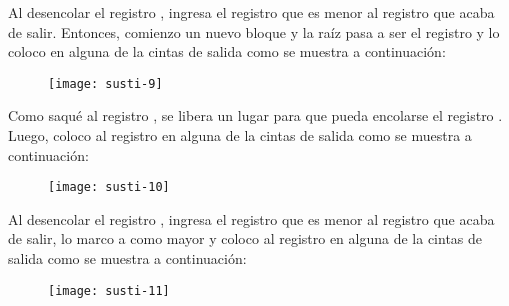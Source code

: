 \documentclass[10pt,a4paper]{article}
\begin{document}
Al desencolar el registro , ingresa el registro  que es menor al registro  que acaba de salir. Entonces, comienzo un nuevo bloque y la raíz pasa a ser el registro  y lo coloco en alguna de la cintas de salida como se muestra a continuación:
\newline
\newline
\begin{figure}[h]
	\centering
\texttt{[image: susti-9]}
	\label{drivers1}
\end{figure}      
\newline
\newline
Como saqué al registro , se libera un lugar para que pueda encolarse el registro . Luego, coloco al registro  en alguna de la cintas de salida como se muestra a continuación:  
\newline
\newline
\begin{figure}[h]
	\centering
\texttt{[image: susti-10]}
	\label{drivers1}
\end{figure}
\newline
\newline
Al desencolar el registro , ingresa el registro  que es menor al registro  que acaba de salir, lo marco a  como mayor y coloco al registro  en alguna de la cintas de salida como se muestra a continuación:
\newline
\newline
\begin{figure}[h]
	\centering
\texttt{[image: susti-11]}
	\label{drivers1}
\end{figure}      
\newpage
\end{document}
